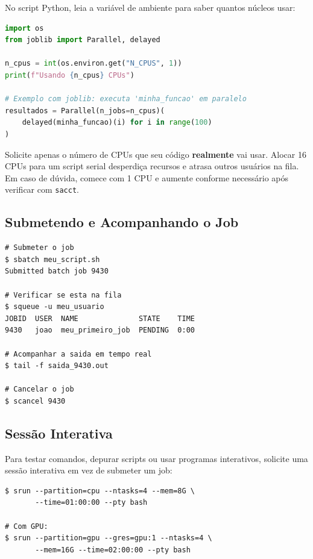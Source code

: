\documentclass[11pt, a4paper]{article}
\newcommand{\cmd}[1]{\texttt{\textcolor{codeblue}{#1}}}
\begin{document}
No script Python, leia a variável de ambiente para saber quantos núcleos
usar:

\begin{lstlisting}[style=script, language=Python]
import os
from joblib import Parallel, delayed

n_cpus = int(os.environ.get("N_CPUS", 1))
print(f"Usando {n_cpus} CPUs")

# Exemplo com joblib: executa 'minha_funcao' em paralelo
resultados = Parallel(n_jobs=n_cpus)(
    delayed(minha_funcao)(i) for i in range(100)
)
\end{lstlisting}

\begin{atencao}
  Solicite apenas o número de CPUs que seu código \textbf{realmente} vai
  usar. Alocar 16 CPUs para um script serial desperdiça recursos e atrasa
  outros usuários na fila. Em caso de dúvida, comece com 1 CPU e aumente
  conforme necessário após verificar com \cmd{sacct}.
\end{atencao}

\subsection{Submetendo e Acompanhando o Job}

\begin{lstlisting}[style=terminal]
# Submeter o job
$ sbatch meu_script.sh
Submitted batch job 9430

# Verificar se esta na fila
$ squeue -u meu_usuario
JOBID  USER  NAME              STATE    TIME
9430   joao  meu_primeiro_job  PENDING  0:00

# Acompanhar a saida em tempo real
$ tail -f saida_9430.out

# Cancelar o job
$ scancel 9430
\end{lstlisting}

\subsection{Sessão Interativa}

Para testar comandos, depurar scripts ou usar programas interativos,
solicite uma sessão interativa em vez de submeter um job:

\begin{lstlisting}[style=terminal]
$ srun --partition=cpu --ntasks=4 --mem=8G \
       --time=01:00:00 --pty bash

# Com GPU:
$ srun --partition=gpu --gres=gpu:1 --ntasks=4 \
       --mem=16G --time=02:00:00 --pty bash
\end{lstlisting}
\end{document}
